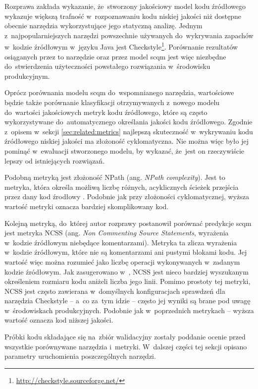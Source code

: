 \documentclass[twoside]{praca}
\begin{document}
Rozprawa zakłada wykazanie, że~stworzony jakościowy model kodu źródłowego wykazuje większą trafność w~rozpoznawaniu kodu niskiej jakości niż dostępne obecnie narzędzia wykorzystujące jego statyczną analizę. Jednym z~najpopularniejszych narzędzi powszechnie używanych do~wykrywania zapachów w~kodzie źródłowym w~języku Java jest Checkstyle\footnote{\url{http://checkstyle.sourceforge.net/}}. Porównanie rezultatów osiąganych przez to narzędzie oraz przez model \gls{scqm} jest więc niezbędne do~stwierdzenia użyteczności powstałego rozwiązania w~środowisku produkcyjnym.

Oprócz porównania modelu \gls{scqm} do~wspomnianego narzędzia, wartościowe będzie także porównanie klasyfikacji otrzymywanych z~nowego modelu do~wartości jakościowych metryk kodu źródłowego, które są często wykorzystywane do~automatycznego określania jakości kodu źródłowego. Zgodnie z~opisem w~sekcji \ref{sec:related:metrics} najlepszą skuteczność w~wykrywaniu kodu źródłowego niskiej jakości ma złożoność cyklomatyczna. Nie można więc było jej pominąć w~ewaluacji stworzonego modelu, by wykazać, że~jest on rzeczywiście lepszy od istniejących rozwiązań.

Podobną metryką jest złożoność NPath (ang. \textit{NPath complexity}). Jest to metryka, która określa możliwą liczbę różnych, acyklicznych ścieżek przejścia przez dany kod źrodłowy \cite{nejmeh1988npath}. Podobnie jak przy złożoności cyklomatycznej, wyższa wartość metryki oznacza bardziej skomplikowany kod.

Kolejną metryką, do~której autor rozprawy postanowił porównać predykcje \gls{scqm} jest metryka NCSS (ang. \textit{Non Commenting Source Statements}, wyrażenia w~kodzie źródłowym niebędące komentarzami). Metryka ta zlicza wyrażenia w~kodzie źródłowym, które nie są komentarzami ani pustymi blokami kodu. Jej wartość więc można rozumieć jako liczbę operacji wykonywanych w~zadanym kodzie źródłowym. Jak zasugerowano w~\cite{ayewah2007evaluating}, NCSS jest nieco bardziej wyszukanym określeniem rozmiaru kodu aniżeli liczba jego linii. Pomimo prostoty tej metryki, NCSS jest często zawierana w~domyślnych konfiguracjach sprawdzeń dla narzędzia Checkstyle -- a~co za~tym idzie -- często jej wyniki są brane pod uwagę w~środowiskach produkcyjnych. Podobnie jak w~poprzednich metrykach -- wyższa wartość oznacza kod niższej jakości.

Próbki kodu składające się na~zbiór walidacyjny zostały poddanie ocenie przed wszystkie porównywane narzędzia i~metryki. W~dalszej części tej sekcji opisano parametry uruchomienia poszczególnych narzędzi.
\end{document}
